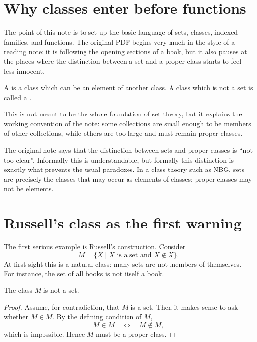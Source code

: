 
\section{Why classes enter before functions}

The point of this note is to set up the basic language of sets, classes, indexed families, and functions.  The original PDF begins very much in the style of a reading note: it is following the opening sections of a book, but it also pauses at the places where the distinction between a set and a proper class starts to feel less innocent.

\begin{definition}
A  is a class which can be an element of another class.  A class which is not a set is called a .
\end{definition}

This is not meant to be the whole foundation of set theory, but it explains the working convention of the note: some collections are small enough to be members of other collections, while others are too large and must remain proper classes.

\begin{caution}
The original note says that the distinction between sets and proper classes is ``not too clear''.  Informally this is understandable, but formally this distinction is exactly what prevents the usual paradoxes.  In a class theory such as NBG, sets are precisely the classes that may occur as elements of classes; proper classes may not be elements.
\end{caution}

\section{Russell's class as the first warning}

The first serious example is Russell's construction.  Consider
\[
  M = \{X \mid X \text{ is a set and } X \notin X\}.
\]
At first sight this is a natural class: many sets are not members of themselves.  For instance, the set of all books is not itself a book.

\begin{proposition}
The class \(M\) is not a set.
\end{proposition}

\begin{proof}
Assume, for contradiction, that \(M\) is a set.  Then it makes sense to ask whether \(M \in M\).  By the defining condition of \(M\),
\[
  M \in M \quad \Longleftrightarrow \quad M \notin M,
\]
which is impossible.  Hence \(M\) must be a proper class.
\end{proof}

